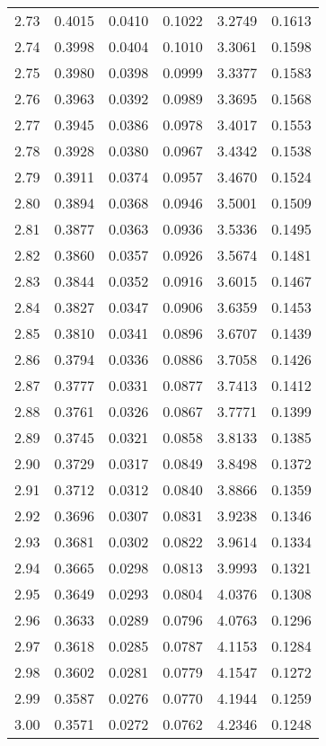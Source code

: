 \documentclass{article}
\begin{document}
\begin{longtable}{cccccc}
2.73 & 0.4015 & 0.0410 & 0.1022 & 3.2749 & 0.1613 \\
2.74 & 0.3998 & 0.0404 & 0.1010 & 3.3061 & 0.1598 \\
2.75 & 0.3980 & 0.0398 & 0.0999 & 3.3377 & 0.1583 \\
2.76 & 0.3963 & 0.0392 & 0.0989 & 3.3695 & 0.1568 \\
2.77 & 0.3945 & 0.0386 & 0.0978 & 3.4017 & 0.1553 \\
2.78 & 0.3928 & 0.0380 & 0.0967 & 3.4342 & 0.1538 \\
2.79 & 0.3911 & 0.0374 & 0.0957 & 3.4670 & 0.1524 \\
2.80 & 0.3894 & 0.0368 & 0.0946 & 3.5001 & 0.1509 \\
2.81 & 0.3877 & 0.0363 & 0.0936 & 3.5336 & 0.1495 \\
2.82 & 0.3860 & 0.0357 & 0.0926 & 3.5674 & 0.1481 \\
2.83 & 0.3844 & 0.0352 & 0.0916 & 3.6015 & 0.1467 \\
2.84 & 0.3827 & 0.0347 & 0.0906 & 3.6359 & 0.1453 \\
2.85 & 0.3810 & 0.0341 & 0.0896 & 3.6707 & 0.1439 \\
2.86 & 0.3794 & 0.0336 & 0.0886 & 3.7058 & 0.1426 \\
2.87 & 0.3777 & 0.0331 & 0.0877 & 3.7413 & 0.1412 \\
2.88 & 0.3761 & 0.0326 & 0.0867 & 3.7771 & 0.1399 \\
2.89 & 0.3745 & 0.0321 & 0.0858 & 3.8133 & 0.1385 \\
2.90 & 0.3729 & 0.0317 & 0.0849 & 3.8498 & 0.1372 \\
2.91 & 0.3712 & 0.0312 & 0.0840 & 3.8866 & 0.1359 \\
2.92 & 0.3696 & 0.0307 & 0.0831 & 3.9238 & 0.1346 \\
2.93 & 0.3681 & 0.0302 & 0.0822 & 3.9614 & 0.1334 \\
2.94 & 0.3665 & 0.0298 & 0.0813 & 3.9993 & 0.1321 \\
2.95 & 0.3649 & 0.0293 & 0.0804 & 4.0376 & 0.1308 \\
2.96 & 0.3633 & 0.0289 & 0.0796 & 4.0763 & 0.1296 \\
2.97 & 0.3618 & 0.0285 & 0.0787 & 4.1153 & 0.1284 \\
2.98 & 0.3602 & 0.0281 & 0.0779 & 4.1547 & 0.1272 \\
2.99 & 0.3587 & 0.0276 & 0.0770 & 4.1944 & 0.1259 \\
3.00 & 0.3571 & 0.0272 & 0.0762 & 4.2346 & 0.1248 \\

\end{longtable}
\end{document}
